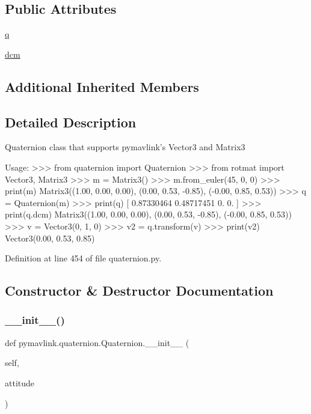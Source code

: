 \subsection*{Public Attributes}
\begin{DoxyCompactItemize}
\item 
\mbox{\hyperlink{classpymavlink_1_1quaternion_1_1Quaternion_a5c0501ca85af5084c918bc443bb714fd}{q}}
\item 
\mbox{\hyperlink{classpymavlink_1_1quaternion_1_1Quaternion_ad761e43a004cb119c4434cb6779b8206}{dcm}}
\end{DoxyCompactItemize}
\subsection*{Additional Inherited Members}


\subsection{Detailed Description}
\begin{DoxyVerb}Quaternion class that supports pymavlink's Vector3 and Matrix3

Usage:
    >>> from quaternion import Quaternion
    >>> from rotmat import Vector3, Matrix3
    >>> m = Matrix3()
    >>> m.from_euler(45, 0, 0)
    >>> print(m)
    Matrix3((1.00, 0.00, 0.00), (0.00, 0.53, -0.85), (-0.00, 0.85, 0.53))
    >>> q = Quaternion(m)
    >>> print(q)
    [ 0.87330464  0.48717451  0.          0.        ]
    >>> print(q.dcm)
    Matrix3((1.00, 0.00, 0.00), (0.00, 0.53, -0.85), (-0.00, 0.85, 0.53))
    >>> v = Vector3(0, 1, 0)
    >>> v2 = q.transform(v)
    >>> print(v2)
    Vector3(0.00, 0.53, 0.85)
\end{DoxyVerb}
 

Definition at line 454 of file quaternion.\+py.



\subsection{Constructor \& Destructor Documentation}
\mbox{\label{classpymavlink_1_1quaternion_1_1Quaternion_ad82c01c2f6c5edc2e25d367624f565c5}} 
\subsubsection{\texorpdfstring{\_\_init\_\_()}{\_\_init\_\_()}}
{\footnotesize\ttfamily def pymavlink.\+quaternion.\+Quaternion.\+\_\+\+\_\+init\+\_\+\+\_\+ (\begin{DoxyParamCaption}\item[{}]{self,  }\item[{}]{attitude }\end{DoxyParamCaption})}

